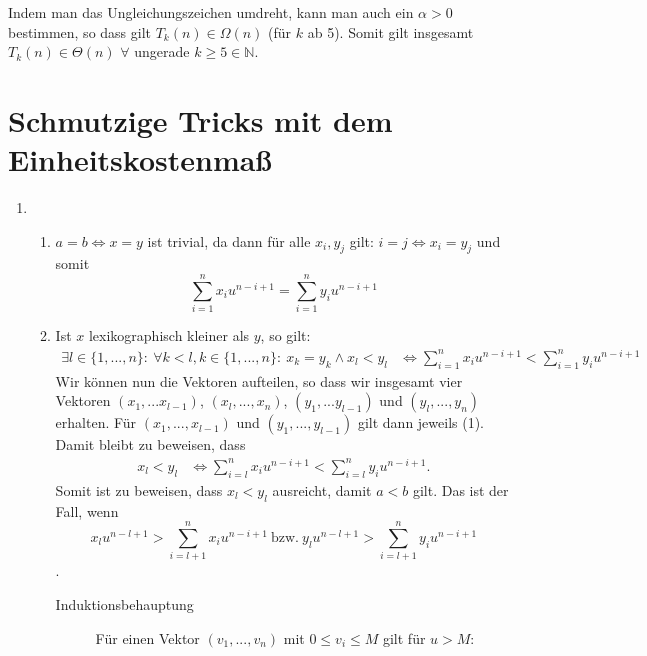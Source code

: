 \documentclass[a4paper,10pt]{scrartcl}
\renewcommand{\labelenumii}{(\theenumii)}
\renewcommand{\theenumii}{\roman{enumii}}
\begin{document}
Indem man das Ungleichungszeichen umdreht, kann man auch ein $\alpha > 0$ bestimmen, so dass gilt $T_k(n) \in \Omega(n)$ (für $k$ ab 5). Somit gilt insgesamt $T_k(n) \in \Theta(n)$ $\forall$ ungerade $k \ge 5 \in \mathbb{N}$.
\section{Schmutzige Tricks mit dem Einheitskostenmaß}

\begin{enumerate}
\item   \renewcommand{\labelenumii}{(\theenumii)}
        \renewcommand{\theenumii}{\arabic{enumii}}
        \begin{enumerate} \newcommand{\lex}[1]{\ensuremath{\underset{\text{lex}}{#1}}}
        \item	$a = b \Leftrightarrow x = y$ ist trivial, da dann für
	alle $x_i, y_j$ gilt: $i = j \Leftrightarrow x_i = y_j$ und
	somit\\
                \[\sum\limits_{i=1}^{n} x_{i}u^{n-i+1} = \sum\limits_{i=1}^{n} y_{i}u^{n-i+1}\]
	\item	Ist $x$ lexikographisch kleiner als $y$, so gilt:
                \begin{align*}
                    \exists l \in \{1, ..., n\}{:}\ \forall k < l, k \in \{1, ..., n\}{:}\ x_k = y_k \land x_l < y_l 
                        &\Leftrightarrow \sum\limits_{i=1}^{n} x_{i}u^{n-i+1} < \sum\limits_{i=1}^{n} y_{i}u^{n-i+1}
                \end{align*}
		Wir können nun die Vektoren aufteilen, so dass wir
		insgesamt vier Vektoren $(x_1,...x_{l-1})$,
		$(x_l,...,x_n)$, $(y_1,...y_{l-1})$ und
		$(y_l,...,y_n)$ erhalten. Für $(x_1, ..., x_{l-1})$ und $(y_1, ..., y_{l-1})$ gilt 
                dann jeweils (1). Damit bleibt zu beweisen, dass
                \begin{align*}
                    x_l < y_l 
                        &\Leftrightarrow \sum\limits_{i=l}^{n} x_{i}u^{n-i+1} < \sum\limits_{i=l}^{n} y_{i}u^{n-i+1}.
                \end{align*}
		Somit ist zu beweisen, dass $x_l < y_l$ ausreicht, damit
		$a < b$ gilt. Das ist der Fall, wenn
                \[x_l u^{n-l+1} > \sum\limits_{i=l+1}^{n} x_{i}u^{n-i+1}\ \text{bzw.}\ y_l u^{n-l+1} > \sum\limits_{i=l+1}^{n} y_{i}u^{n-i+1}\].
                \begin{description}
                \item[Induktionsbehauptung] Für einen Vektor $(v_1,...,v_n)$ mit $0 \leq v_i \leq M$ gilt für $u > M$:

\end{description}
\end{enumerate}
\end{enumerate}
\end{document}
